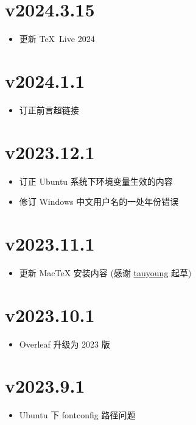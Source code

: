 \section*{v2024.3.15}

\begin{itemize}
  \item 更新 \TeX\ Live 2024
\end{itemize}

\section*{v2024.1.1}

\begin{itemize}
  \item 订正前言超链接
\end{itemize}

\section*{v2023.12.1}

\begin{itemize}
  \item 订正 Ubuntu 系统下环境变量生效的内容
  \item 修订 Windows 中文用户名的一处年份错误
\end{itemize}

\section*{v2023.11.1}

\begin{itemize}
  \item 更新 MacTeX 安装内容 (感谢 \href{https://github.com/tauyoungsama}{tauyoung} 起草)
\end{itemize}

\section*{v2023.10.1}

\begin{itemize}
  \item Overleaf 升级为 2023 版
\end{itemize}

\section*{v2023.9.1}

\begin{itemize}
  \item Ubuntu 下 fontconfig 路径问题
\end{itemize}

